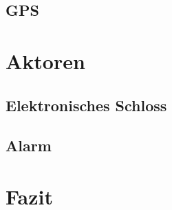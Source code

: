 \documentclass{sigchi}
\begin{document}
\subsection{GPS}

\section{Aktoren}

\subsection{Elektronisches Schloss}

\subsection{Alarm}

\section{Fazit}

\balance{}



\end{document}
